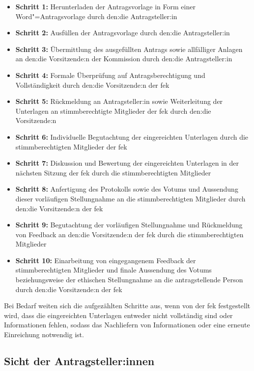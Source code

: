 \documentclass[a4paper,12pt,twoside,numbers=noendperiod]{scrreprt}
\begin{document}
\begin{itemize}
    \item \textbf{Schritt 1:} Herunterladen der Antragsvorlage in Form einer Word"=Antragsvorlage durch den:die Antragsteller:in
    \item \textbf{Schritt 2:} Ausfüllen der Antragsvorlage durch den:die Antragsteller:in
    \item \textbf{Schritt 3:} Übermittlung des ausgefüllten Antrags sowie allfälliger Anlagen an den:die Vorsitzende:n der Kommission durch den:die Antragsteller:in
    \item \textbf{Schritt 4:} Formale Überprüfung auf Antragsberechtigung und Vollständigkeit durch den:die Vorsitzende:n der \ac{fek}
    \item \textbf{Schritt 5:} Rückmeldung an Antragsteller:in sowie Weiterleitung der Unterlagen an stimmberechtigte Mitglieder der \ac{fek} durch den:die Vorsitzende:n
    \item \textbf{Schritt 6:} Individuelle Begutachtung der eingereichten Unterlagen durch die stimmberechtigten Mitglieder der \ac{fek}
    \item \textbf{Schritt 7:} Diskussion und Bewertung der eingereichten Unterlagen in der nächsten Sitzung der \ac{fek} durch die stimmberechtigten Mitglieder
    \item \textbf{Schritt 8:} Anfertigung des Protokolls sowie des Votums und Aussendung dieser vorläufigen Stellungnahme an die stimmberechtigten Mitglieder durch den:die Vorsitzende:n der \ac{fek}
    \item \textbf{Schritt 9:} Begutachtung der vorläufigen Stellungnahme und Rückmeldung von Feedback an den:die Vorsitzende:n der \ac{fek} durch die stimmberechtigten Mitglieder
    \item \textbf{Schritt 10:} Einarbeitung von eingegangenem Feedback der stimmberechtigten Mitglieder und finale Aussendung des Votums beziehungsweise der ethischen Stellungnahme an die antragstellende Person durch den:die Vorsitzende:n der \ac{fek}
\end{itemize}

Bei Bedarf weiten sich die aufgezählten Schritte aus, wenn von der \ac{fek} festgestellt wird, dass die eingereichten Unterlagen entweder nicht vollständig sind oder Informationen fehlen, sodass das Nachliefern von Informationen oder eine erneute Einreichung notwendig ist.

\subsection{Sicht der Antragsteller:innen}
\label{sub-sec:ablauf-sicht-Antragsteller}
\end{document}
